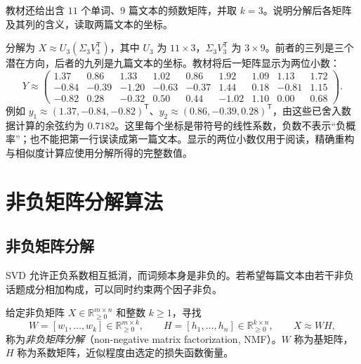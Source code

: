 \begin{example}
\label{ex:lh-lsa-textbook-nine-documents}
教材还给出含 $11$ 个单词、$9$ 篇文本的频数矩阵，并取 $k=3$。说明分解后各矩阵及其列的含义，读取两篇文本的坐标。
\end{example}
\begin{solve}
分解为 $X\approx U_3(\Sigma_3V_3^{\mathsf T})$，其中 $U_3$ 为 $11\times3$，$\Sigma_3V_3^{\mathsf T}$ 为 $3\times9$。前者的三列是三个潜在方向，后者的九列是九篇文本的坐标。教材将后一矩阵显示为两位小数：
\begin{equation}
Y\approx\begin{pmatrix}
1.37&0.86&1.33&1.02&0.86&1.92&1.09&1.13&1.72\\
-0.84&-0.39&-1.20&-0.63&-0.37&1.44&0.18&-0.81&1.15\\
-0.82&0.28&-0.32&0.50&0.44&-1.02&1.10&0.00&0.68
\end{pmatrix}.
\label{eq:lh-lsa-nine-documents-coordinates}
\end{equation}
例如 $y_1\approx(1.37,-0.84,-0.82)^{\mathsf T}$、$y_2\approx(0.86,-0.39,0.28)^{\mathsf T}$，由这些已舍入数据计算的余弦约为 $0.7182$。这里每个坐标是带符号的线性系数，负数不表示“负概率”；也不能把第一行误读成第一篇文本。显示的两位小数仅用于阅读，精确重构与相似度计算应使用分解所得的完整数值。
\end{solve}

\section{非负矩阵分解算法}
\label{sec:lh-lsa-nmf}

\subsection{非负矩阵分解}
\label{subsec:lh-lsa-nmf-definition}

SVD 允许正负系数相互抵消，而词频本身是非负的。若希望每篇文本由若干非负话题成分相加构成，可以同时约束两个因子非负。

\begin{definition}[非负矩阵分解]
\label{def:lh-lsa-nmf}
给定非负矩阵 $X\in\mathbb R_{\geq0}^{m\times n}$ 和整数 $k\geq1$，寻找
\begin{equation}
W=[w_1,\ldots,w_k]\in\mathbb R_{\geq0}^{m\times k},\qquad
H=[h_1,\ldots,h_n]\in\mathbb R_{\geq0}^{k\times n},\qquad
X\approx WH,
\label{eq:lh-lsa-nmf-factorization}
\end{equation}
称为\emph{非负矩阵分解}（non-negative matrix factorization, NMF）。$W$ 称为基矩阵，$H$ 称为系数矩阵，近似程度由选定的损失函数衡量。
\end{definition}

